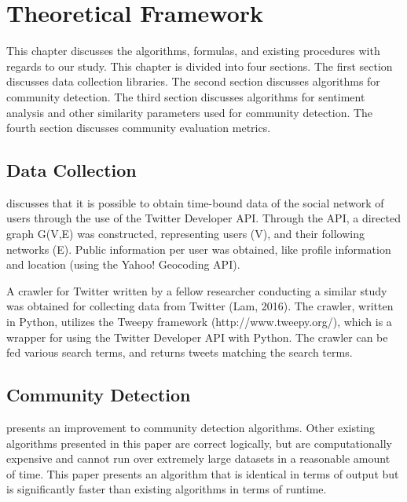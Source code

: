 %
%
%                 


\chapter{Theoretical Framework}
\label{sec:theoframe}


This chapter discusses the algorithms, formulas, and existing procedures with regards to our study. This chapter is divided into four sections. The first section discusses data collection libraries. The second section discusses algorithms for community detection. The third section discusses algorithms for sentiment analysis and other similarity parameters used for community detection. The fourth section discusses community evaluation metrics.


\section{Data Collection}
 
 discusses that it is possible to obtain time-bound data of the social network of users through the use of the Twitter Developer API. Through the API, a directed graph G(V,E) was constructed, representing users (V), and their following networks (E). Public information per user was obtained, like profile information and location (using the Yahoo! Geocoding API). 
 
A crawler for Twitter written by a fellow researcher conducting a similar study was obtained for collecting data from Twitter (Lam, 2016). The crawler, written in Python, utilizes the Tweepy framework (http://www.tweepy.org/), which is a wrapper for using the Twitter Developer API with Python. The crawler can be fed various search terms, and returns tweets matching the search terms.
 
\section{Community Detection}
\label{sec:commdet}


 presents an improvement to community detection algorithms. Other existing algorithms presented in this paper are correct logically, but are computationally expensive and cannot run over extremely large datasets in a reasonable amount of time. This paper presents an algorithm that is identical in terms of output but is significantly faster than existing algorithms in terms of runtime.


